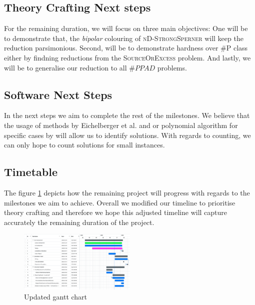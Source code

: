 \subsection{Theory Crafting Next steps}

For the remaining duration, we will focus on three main objectives:
One will be to demonstrate that, the \textit{bipolar} colouring
of \textsc{nD-StrongSperner} will keep the reduction parsimonious.
Second, will be to demonstrate hardness over \textsc{\#P} class either by findning
reductions from the \textsc{SourceOrExcess} problem.
And lastly, we will be to generalise our reduction to all $\#PPAD$ problems.


\subsection{Software Next Steps}

In the next steps we aim to complete the rest of the milestones. 
We believe that the usage of methods by Eichelberger et al. \cite{eichelberger_HazardDetectionCombinational_1965}
and or polynomial algorithm for specific cases by \cite{deligkas_PureCircuitTightInapproximability_2024}
will allow us to identify solutions. With regards to counting, we can only hope
to count solutions for small instances.


\subsection{Timetable}

The figure \ref{fig:gantt-new} depicts how the remaining project will progress with regards
to the milestones we aim to achieve. Overall we modified our timeline to prioritise
theory crafting and therefore we hope this adjusted timeline will capture accurately the remaining duration
of the project.

\begin{figure}
    \includegraphics[width=0.5\textwidth]{assets/gantt_new.png}
    \caption{Updated gantt chart}\label{fig:gantt-new}
\end{figure}

